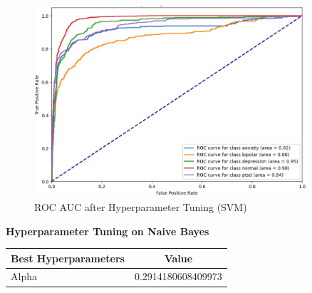 \begin{figure}[h!]  
    \centering
    \includegraphics[width=0.9\textwidth]{Images/HP SVM ROC.png}  
    \caption{ROC AUC after Hyperparameter Tuning (SVM)}
    \label{LSTMROC}  %
\end{figure}


\pagebreak

\begin{center}
    \textbf{Hyperparameter Tuning on Naive Bayes} \\[0.5em]
    \begin{tabular}{|l|c|}
        \hline
        \textbf{Best Hyperparameters}  & \textbf{Value} \\ \hline
        Alpha                         & 0.2914180608409973 \\ \hline
    \end{tabular}
\end{center}

